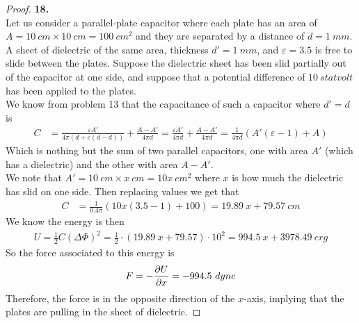 \documentclass[11pt]{article}
\theoremstyle{definition}
\begin{document}
\cleardoublepage
\begin{proof}{\textbf{18.}}\\
Let us consider a parallel-plate capacitor where each plate has an area of
$A = 10~cm \times 10~cm = 100~cm^2$ and they are separated by a distance of
$d = 1~mm$.
A sheet of dielectric of the same area, thickness $d' = 1~mm$, and
$\varepsilon = 3.5$ is free to slide between the plates.
Suppose the dielectric sheet has been slid partially out of the capacitor at
one side, and suppose that a potential difference of $10~statvolt$ has been
applied to the plates.
\\
We know from problem 13 that the capacitance of such a capacitor where $d' = d$
is
\begin{align*}
    C &= \frac{\varepsilon A'}{4\pi(d + \varepsilon(d - d))} + \frac{A - A'}{4\pi d}
    = \frac{\varepsilon A'}{4\pi d} + \frac{A - A'}{4\pi d}
    = \frac{1}{4\pi d}(A'(\varepsilon - 1) + A)
\end{align*}
Which is nothing but the sum of two parallel capacitors, one with area $A'$
(which has a dielectric) and the other with area $A - A'$.
\\
We note that $A' = 10~cm \times x~cm = 10x~cm^2$ where $x$ is how much the
dielectric has slid on one side.
Then replacing values we get that
\begin{align*}
    C &= \frac{1}{0.4 \pi}(10x(3.5 - 1) + 100)
    = 19.89~x + 79.57~cm
\end{align*}
We know the energy is then
\begin{align*}
    U = \frac{1}{2}C(\Delta\Phi)^2
    = \frac{1}{2} \cdot (19.89~x + 79.57) \cdot 10^2
    = 994.5~x + 3978.49~erg
\end{align*}
So the force associated to this energy is 
\begin{align*}
    F = - \pdv{U}{x} = -994.5~dyne
\end{align*}
Therefore, the force is in the opposite direction of the $x$-axis,
implying that the plates are pulling in the sheet of dielectric.

\end{proof}
\end{document}
